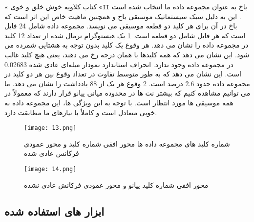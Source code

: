 «
کتاب کلاویه خوش خلق و خوی 
\verb;«II;
باخ به عنوان مجموعه داده ما انتخاب شده است . این
به دلیل سبک سیستماتیک موسیقی باخ و همچنین ماهیت خاص این اثر است که باخ در آن
برای هر کلید دو قطعه موسیقی می نویسد. مجموعه داده شامل 24 فایل است که هر فایل شامل دو قطعه است.   
\cref{fig.13}
یک هیستوگرام نرمال شده از تعداد 12 کلید در مجموعه داده را نشان می دهد. هر وقوع یک کلید
بدون توجه به هشتایی شمرده می شود.  این نشان می دهد که همه کلیدها با همان درجه رخ می دهند، یعنی 
هیچ کلید غالب در مجموعه داده وجود ندارد. انحراف استاندارد نمودار میله‌ای عادی شده 0.02683 است. این
نشان می دهد که به طور متوسط ​​تفاوت در تعداد وقوع بین هر دو کلید در مجموعه داده 
حدود 2.6 درصد است.  
\cref{fig.14}
وقوع هر یک از 88 یادداشت را نشان می دهد. ما می توانیم مشاهده کنیم که بیشتر
نت ها در محدوده میانی پیانو قرار دارند که معمولاً در همه موسیقی ها مورد انتظار است. با توجه به این
ویژگی ها، این مجموعه داده به خوبی متعادل است و کاملاً با نیازهای ما مطابقت دارد. 



\begin{figure}[!h]
\texttt{[image: 13.png]}
\caption{شماره کلید های مجموعه داده ها محور افقی شماره کلید و محور عمودی فرکانس عادی شده}\label{fig.13}
\end{figure}

\begin{figure}[!h]
\texttt{[image: 14.png]}
\caption{محور افقی شماره کلید پیانو و محور عمودی فرکانش عادی نشده}\label{fig.14}
\end{figure}

\subsection{ابزار های استفاده شده}

